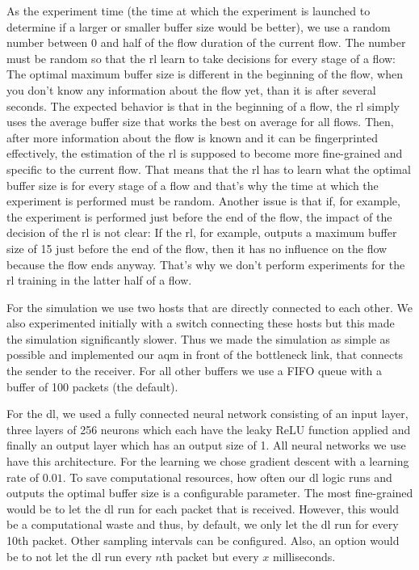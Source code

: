 \documentclass[conference]{IEEEtran}
\begin{document}
As the experiment time (the time at which the experiment is launched to determine if a larger or smaller buffer size would be better), we use a random number between 0 and half of the flow duration of the current flow. The number must be random so that the \gls{rl} learn to take decisions for every stage of a flow: The optimal maximum buffer size is different in the beginning of the flow, when you don't know any information about the flow yet, than it is after several seconds. The expected behavior is that in the beginning of a flow, the \gls{rl} simply uses the average buffer size that works the best on average for all flows. Then, after more information about the flow is known and it can be fingerprinted effectively, the estimation of the \gls{rl} is supposed to become more fine-grained and specific to the current flow. That means that the \gls{rl} has to learn what the optimal buffer size is for every stage of a flow and that's why the time at which the experiment is performed must be random. Another issue is that if, for example, the experiment is performed just before the end of the flow, the impact of the decision of the \gls{rl} is not clear: If the \gls{rl}, for example, outputs a maximum buffer size of 15 just before the end of the flow, then it has no influence on the flow because the flow ends anyway. That's why we don't perform experiments for the \gls{rl} training in the latter half of a flow.  

For the simulation we use two hosts that are directly connected to each other. We also experimented initially with a switch connecting these hosts but this made the simulation significantly slower. Thus we made the simulation as simple as possible and implemented our \gls{aqm} in front of the bottleneck link, that connects the sender to the receiver. For all other buffers we use a FIFO queue with a buffer of 100 packets (the default). 

For the \gls{dl}, we used a fully connected neural network consisting of an input layer, three layers of 256 neurons which each have the leaky ReLU \cite{noauthor_rectifier_2020} function applied and finally an output layer which has an output size of 1. All neural networks we use have this architecture. For the learning we chose gradient descent with a learning rate of $0.01$. To save computational resources, how often our \gls{dl} logic runs and outputs the optimal buffer size is a configurable parameter. The most fine-grained would be to let the \gls{dl} run for each packet that is received. However, this would be a computational waste and thus, by default, we only let the \gls{dl} run for every 10th packet. Other sampling intervals can be configured. Also, an option would be to not let the \gls{dl} run every $n$th packet but every $x$ milliseconds. 
\end{document}
